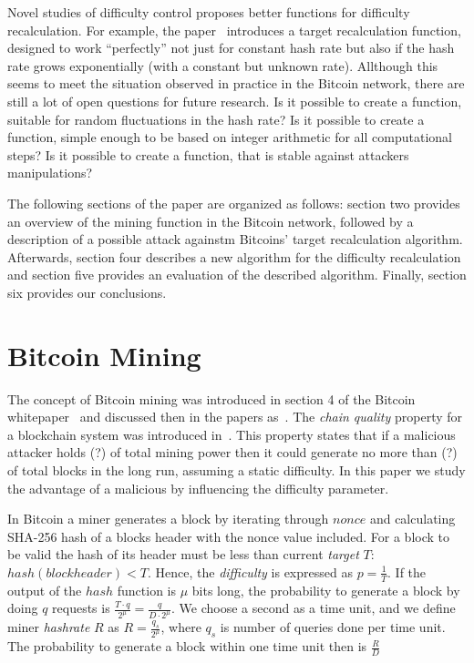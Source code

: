 \documentclass[number,preprint,review]{elsarticle}
\begin{document}
Novel studies of difficulty control proposes better functions for difficulty recalculation.
For example, the paper~\cite{kraft2015difficulty} introduces a target recalculation function, designed to work “perfectly” not just for constant hash rate but also if the hash rate grows exponentially (with a constant but unknown rate).
Allthough this seems to meet the situation observed in practice in the Bitcoin network, there are still a lot of open questions for future research.
Is it possible to create a function, suitable for random fluctuations in the hash rate?
Is it possible to create a function, simple enough to be based on integer arithmetic for all computational steps?
Is it possible to create a function, that is stable against attackers manipulations?

The following sections of the paper are organized as follows: section two provides an overview of the mining function in the Bitcoin network, followed by a description of a possible attack againstm Bitcoins' target recalculation algorithm. Afterwards, section four describes a new algorithm for the difficulty recalculation and section five provides an evaluation of the described algorithm. Finally, section six provides our conclusions.

\section{Bitcoin Mining}
\label{sec:bit}

The concept of Bitcoin mining was introduced in section 4 of the Bitcoin whitepaper~\cite{Nakamoto2008} and discussed then in the papers as~\cite{kraft2015difficulty, miller2014permacoin, eyal2014majority, garay2015bitcoin}. The \textit{chain quality} property for a blockchain system was introduced in~\cite{garay2015bitcoin}. This property states that if a malicious attacker holds (?) of total mining power then it could generate no more than (?) of total blocks in the long run, assuming a static difficulty. In this paper we study the advantage of a malicious by influencing the difficulty parameter.

In Bitcoin a miner generates a block by iterating through \(nonce\) and calculating SHA-256 hash of a blocks header with the nonce value included.
For a block to be valid the hash of its header must be less than current \textit{target} \(T\): \( hash(blockheader) < T \). Hence, the \textit{difficulty} is expressed as \(p=\frac{1}{T}\). If the output of the \(hash\) function is \(\mu\) bits long, the probability to generate a block by doing \(q\) requests is \(\frac{T \cdot q}{2^\mu} = \frac{q}{D \cdot 2^\mu}\). We choose a second as a time unit, and we define miner \textit{hashrate} \(R\) as \(R = \frac{q_s}{2^\mu}\), where \(q_s\) is number of queries done per time unit. The probability to generate a block within one time unit then is \(\frac{R}{D}\)
\end{document}
